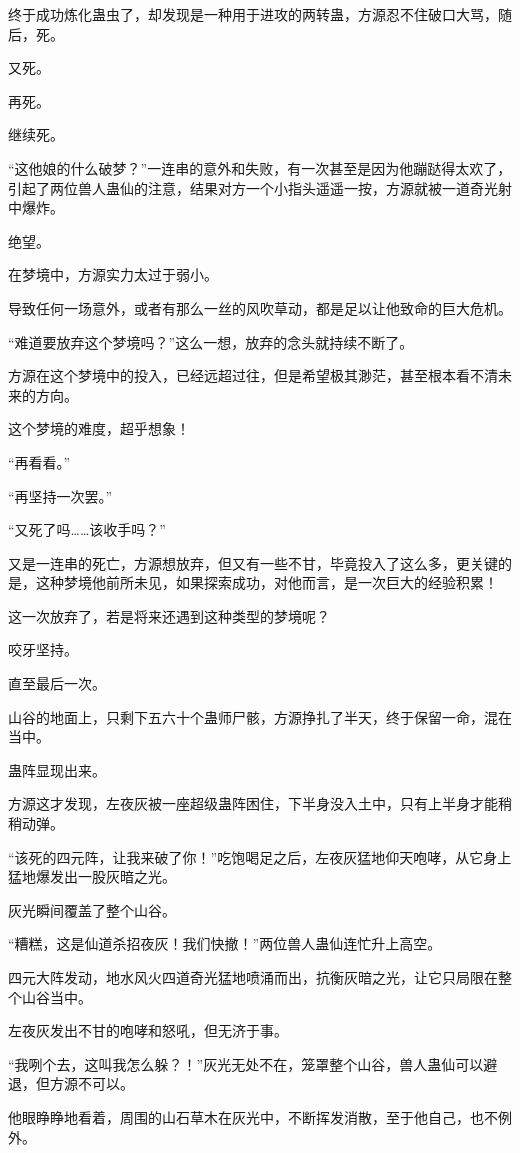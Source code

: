 \begin{this_body}
终于成功炼化蛊虫了，却发现是一种用于进攻的两转蛊，方源忍不住破口大骂，随后，死。

又死。

再死。

继续死。

“这他娘的什么破梦？”一连串的意外和失败，有一次甚至是因为他蹦跶得太欢了，引起了两位兽人蛊仙的注意，结果对方一个小指头遥遥一按，方源就被一道奇光射中爆炸。

绝望。

在梦境中，方源实力太过于弱小。

导致任何一场意外，或者有那么一丝的风吹草动，都是足以让他致命的巨大危机。

“难道要放弃这个梦境吗？”这么一想，放弃的念头就持续不断了。

方源在这个梦境中的投入，已经远超过往，但是希望极其渺茫，甚至根本看不清未来的方向。

这个梦境的难度，超乎想象！

“再看看。”

“再坚持一次罢。”

“又死了吗……该收手吗？”

又是一连串的死亡，方源想放弃，但又有一些不甘，毕竟投入了这么多，更关键的是，这种梦境他前所未见，如果探索成功，对他而言，是一次巨大的经验积累！

这一次放弃了，若是将来还遇到这种类型的梦境呢？

咬牙坚持。

直至最后一次。

山谷的地面上，只剩下五六十个蛊师尸骸，方源挣扎了半天，终于保留一命，混在当中。

蛊阵显现出来。

方源这才发现，左夜灰被一座超级蛊阵困住，下半身没入土中，只有上半身才能稍稍动弹。

“该死的四元阵，让我来破了你！”吃饱喝足之后，左夜灰猛地仰天咆哮，从它身上猛地爆发出一股灰暗之光。

灰光瞬间覆盖了整个山谷。

“糟糕，这是仙道杀招夜灰！我们快撤！”两位兽人蛊仙连忙升上高空。

四元大阵发动，地水风火四道奇光猛地喷涌而出，抗衡灰暗之光，让它只局限在整个山谷当中。

左夜灰发出不甘的咆哮和怒吼，但无济于事。

“我咧个去，这叫我怎么躲？！”灰光无处不在，笼罩整个山谷，兽人蛊仙可以避退，但方源不可以。

他眼睁睁地看着，周围的山石草木在灰光中，不断挥发消散，至于他自己，也不例外。


\end{this_body}
